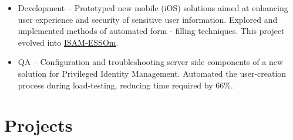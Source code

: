 \begin{itemize}
  \begin{itemize}
  \tightlist
  \item
    Development -- Prototyped new mobile (iOS) solutions aimed at
    enhancing user experience and security of sensitive user
    information. Explored and implemented methods of automated form -
    filling techniques. This project evolved into
    \href{https://itunes.apple.com/us/app/isam-essom/id741972716?mt=8}{ISAM-ESSOm}.
  \item
    QA -- Configuration and troubleshooting server side components of a
    new solution for Privileged Identity Management. Automated the
    user-creation process during load-testing, reducing time required by
    66\%.
  \end{itemize}
\end{itemize}

\section{Projects}\label{projects}

